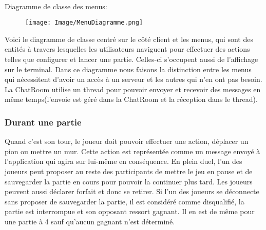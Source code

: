\documentclass[french, utf8]{article}
\begin{document}
\begin{center}
\begin{tabular}{|m{3cm}|m{3cm}|m{3cm}|m{3cm}|m{3cm}|}
\hline
\end{tabular}\\
\end{center}
\label{sec:MenuPrincipalUser}
Diagramme de classe des menus:
\begin{figure}[ht]
\centering
    \texttt{[image: Image/MenuDiagramme.png]}
\end{figure}

Voici le diagramme de classe centré sur le côté client et les menus, qui sont des entités à travers lesquelles les utilisateurs naviguent pour effectuer des actions telles que configurer et lancer une partie. Celles-ci s'occupent aussi de l'affichage sur le terminal. \newline
Dans ce diagramme nous faisons la distinction entre les menus qui nécessitent d'avoir un accès à un serveur et les autres qui n'en ont pas besoin. \newline
La ChatRoom utilise un thread pour pouvoir envoyer et recevoir des messages en même temps(l'envoie est géré dans la ChatRoom et la réception dans le thread).


\subsubsection{Durant une partie}
Quand c'est son tour, le joueur doit pouvoir effectuer une action, déplacer un pion ou mettre un mur. Cette action est représentée comme un message envoyé à l'application qui agira sur lui-même en conséquence.
En plein duel, l'un des joueurs peut proposer au reste des participants de mettre le jeu en pause et de sauvegarder la partie en cours pour pouvoir la continuer plus tard. Les joueurs peuvent aussi déclarer forfait et donc se retirer. \newline
Si l'un des joueurs se déconnecte sans proposer de sauvegarder la partie, il est considéré comme disqualifié, la partie est interrompue et son opposant ressort gagnant. Il en est de même pour une partie à 4 sauf qu'aucun gagnant n'est déterminé.
\newline
\end{document}
